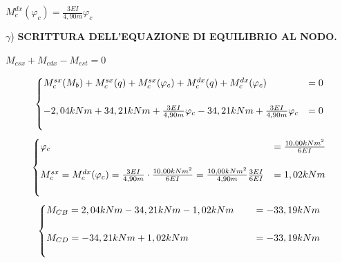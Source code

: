 \documentclass[a4paper,12pt, oneside]{book}
\newenvironment{tightcenter}{%
	\setlength\topsep{0pt}
	\setlength\parskip{0pt}
	\begin{center}
	}{%
	\end{center}
}
\begin{document}
    \begin{tightcenter}
    $M_{c}^{dx}(\varphi_{c})=\frac{3EI}{4,90m}\varphi_{c}$
    \end{tightcenter}
    \leavevmode\newline
    \leavevmode\newline
    \leavevmode\newline
    $\gamma$) \textbf{SCRITTURA DELL'EQUAZIONE DI EQUILIBRIO AL NODO.} 
    \leavevmode\newline
    \leavevmode\newline
    \begin{tightcenter}
      $ M_{csx}+M_{cdx}-M_{est}=0  $
    \end{tightcenter}
    \leavevmode\newline 
    \begin{equation}
    	\begin{cases}
    		M_{c}^{sx}(M_b)+M_{c}^{sx}(q)+M_{c}^{sx}(\varphi_{c})+M_{c}^{dx}(q)+M_{c}^{dx}(\varphi_{c})&=0 \\ \\
    		-2,04kNm+34,21kNm+\frac{3EI}{4,90m}\varphi_{c}-34,21kNm+\frac{3EI}{4,90m}\varphi_{c}&=0\\ \\ 
    	\end{cases}
    	\hfill
    \end{equation}
   \leavevmode\newline
    \begin{equation}
    	\begin{cases}
    		\varphi_{c}&=\frac{10,00kNm^{2}}{6EI}\\ \\
    		M_{c}^{sx}=M_{c}^{dx}(\varphi_{c})=\frac{3EI}{4,90m}\cdot\frac{10,00kNm^{2}}{6EI}=\frac{10,00kNm^{2}}{4,90m}\frac{3EI}{6EI}&=1,02kNm\\ \\ 
    	\end{cases}
    	\hfill
    \end{equation}
    \leavevmode\newline
    \begin{equation}
    	\begin{cases}
    		M_{CB}=2,04kNm-34,21kNm-1,02kNm\phantom{tes}&=-33,19kNm \\ \\
    		M_{CD}=-34,21kNm+1,02kNm\phantom{tes}&=-33,19kNm\\ \\ 
    	\end{cases}
    	\hfill
    \end{equation}
\end{document}
